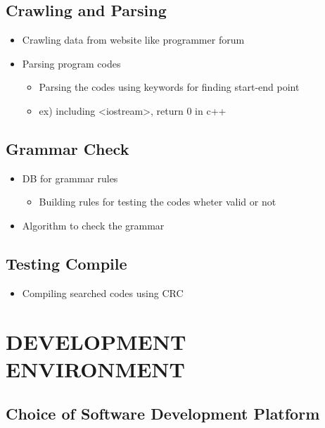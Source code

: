 \documentclass[conference]{IEEEtran}
\begin{document}
\subsection{Crawling and Parsing}
\begin{itemize}
  \item Crawling data from website like programmer forum
  \item Parsing program codes
  \begin{itemize}
    \item Parsing the codes using keywords for finding start-end point
    \item ex) including <iostream>, return 0 in c++
  \end{itemize}
\end{itemize}
\textit{ }

\subsection{Grammar Check}
\begin{itemize}
  \item DB for grammar rules
  \begin{itemize}
    \item Building rules for testing the codes wheter valid or not
  \end{itemize}
  \item Algorithm to check the grammar
\end{itemize}
\textit{ }

\subsection{Testing Compile}
  \begin{itemize}
    \item Compiling searched codes using CRC
  \end{itemize}
\textit{ }

\section{DEVELOPMENT ENVIRONMENT} %
\label{sec:development_environment}
\subsection{Choice of Software Development Platform} %
\label{sub:choice_of_software_development_platform}
\end{document}

